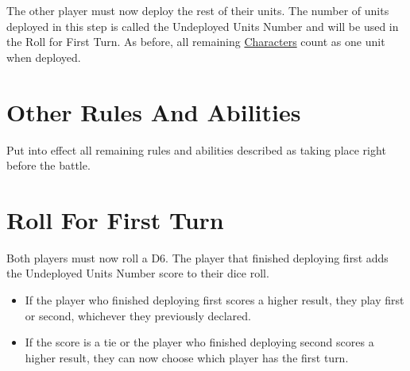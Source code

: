 The other player must now deploy the rest of their units. The number of units deployed in this step is called the Undeployed Units Number and will be used in the Roll for First Turn. As before, all remaining \hyperref[characters]{Characters} count as one unit when deployed.

\section{Other Rules And Abilities}
\label{other_rules_and_abilities}

Put into effect all remaining rules and abilities described as taking place right before the battle.

\newpage
\section{Roll For First Turn}
\label{roll_for_first_turn}

Both players must now roll a D6. The player that finished deploying first adds the Undeployed Units Number score to their dice roll.
\begin{itemize}[label={-}]
\item If the player who finished deploying first scores a higher result, they play first or second, whichever they previously declared.
\item If the score is a tie or the player who finished deploying second scores a higher result, they can now choose which player has the first turn.
\end{itemize}

